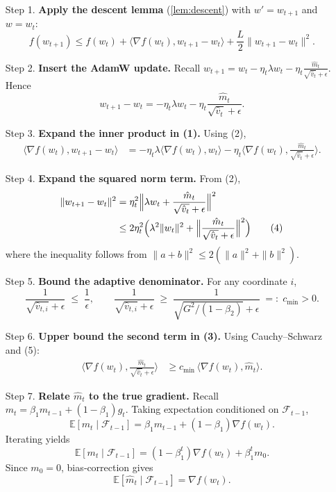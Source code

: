 \documentclass{article}
\newcommand{\EE}{\mathbb{E}}
\begin{document}
\begin{enumerate}
\item[Step 1.] \textbf{Apply the descent lemma} (\ref{lem:descent}) with $w'=w_{t+1}$ and $w=w_t$:
\[
f(w_{t+1}) \le f(w_t) + \langle\nabla f(w_t),w_{t+1}-w_t\rangle
                + \frac{L}{2}\|w_{t+1}-w_t\|^2 .
\tag{1}
\]

\item[Step 2.] \textbf{Insert the AdamW update.}
Recall $w_{t+1}= w_t - \eta_t\lambda w_t - \eta_t\frac{\hat m_t}{\sqrt{\hat v_t}+\epsilon}$.
Hence
\[
w_{t+1}-w_t = -\eta_t\lambda w_t - \eta_t\frac{\hat m_t}{\sqrt{\hat v_t}+\epsilon}.
\tag{2}
\]

\item[Step 3.] \textbf{Expand the inner product in (1).}
Using (2),
\[
\begin{aligned}
\langle\nabla f(w_t),w_{t+1}-w_t\rangle
&= -\eta_t\lambda\langle\nabla f(w_t),w_t\rangle
   -\eta_t\Big\langle\nabla f(w_t),
      \frac{\hat m_t}{\sqrt{\hat v_t}+\epsilon}\Big\rangle .
\end{aligned}
\tag{3}
\]

\item[Step 4.] \textbf{Expand the squared norm term.}
From (2),
\[
\begin{aligned}
\|w_{t+1}-w_t\|^2
&= \eta_t^2\Big\|\lambda w_t +
   \frac{\hat m_t}{\sqrt{\hat v_t}+\epsilon}\Big\|^2\\
&\le 2\eta_t^2\Bigl(
   \lambda^2\|w_t\|^2
   +\Big\|\frac{\hat m_t}{\sqrt{\hat v_t}+\epsilon}\Big\|^2\Bigr)
\tag{4}
\end{aligned}
\]
where the inequality follows from $\|a+b\|^2\le2(\|a\|^2+\|b\|^2)$.

\item[Step 5.] \textbf{Bound the adaptive denominator.}
For any coordinate $i$,
\[
\frac{1}{\sqrt{\hat v_{t,i}}+\epsilon}
\;\le\;
\frac{1}{\epsilon},
\qquad
\frac{1}{\sqrt{\hat v_{t,i}}+\epsilon}
\;\ge\;
\frac{1}{\sqrt{G^2/(1-\beta_2)}+\epsilon}
\;=: \;c_{\min}>0 .
\tag{5}
\]

\item[Step 6.] \textbf{Upper bound the second term in (3).}
Using Cauchy–Schwarz and (5):
\[
\begin{aligned}
\Big\langle\nabla f(w_t),
      \frac{\hat m_t}{\sqrt{\hat v_t}+\epsilon}\Big\rangle
&\ge
c_{\min}\,\langle\nabla f(w_t),\hat m_t\rangle .
\end{aligned}
\tag{6}
\]

\item[Step 7.] \textbf{Relate $\hat m_t$ to the true gradient.}
Recall $m_t = \beta_1 m_{t-1}+(1-\beta_1)g_t$.
Taking expectation conditioned on $\mathcal{F}_{t-1}$,
\[
\EE[m_t\mid\mathcal{F}_{t-1}]
 = \beta_1 m_{t-1} + (1-\beta_1)\nabla f(w_t).
\]
Iterating yields
\[
\EE[m_t\mid\mathcal{F}_{t-1}]
 = (1-\beta_1^t)\nabla f(w_t) + \beta_1^t m_0 .
\]
Since $m_0=0$, bias‑correction gives
\[
\EE[\hat m_t\mid\mathcal{F}_{t-1}]
 = \nabla f(w_t).
\tag{7}
\]


\end{enumerate}
\end{document}
